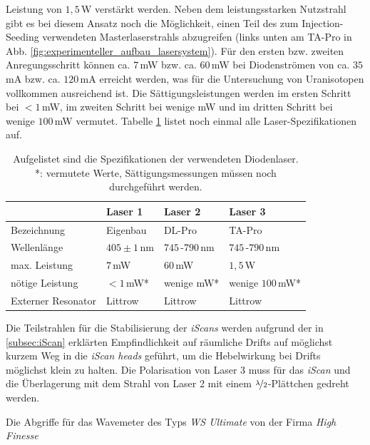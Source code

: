 Leistung von $1,5\,$W verstärkt werden. Neben dem leistungsstarken Nutzstrahl
gibt es bei diesem Ansatz noch die Möglichkeit, einen Teil des zum
Injection-Seeding verwendeten Masterlaserstrahls abzugreifen (links unten am TA-Pro in Abb.
\ref{fig:experimenteller_aufbau_lasersystem}). Für den ersten bzw.
zweiten Anregungsschritt können ca. $7\,$mW bzw. ca. $60\,$mW bei Diodenströmen von ca. $35\,$mA bzw. ca.
$120\,$mA erreicht werden, was für die Untersuchung von Uranisotopen vollkommen
ausreichend ist. Die Sättigungsleistungen werden im ersten Schritt bei $<1\,$mW,
im zweiten Schritt bei wenige mW und im dritten Schritt bei wenige $100\,$mW
vermutet.
Tabelle \ref{tab:laser_spezifikationen} listet noch einmal alle Laser-Spezifikationen auf.
\par
\begin{table}
	\begin{tabular}{p{}|p{}p{}p{}}
		\toprule
		& Laser 1 & Laser 2 & Laser 3\\
		\midrule[1px]
		\hline
		Bezeichnung & Eigenbau & DL-Pro & TA-Pro\\
		Wellenlänge & $405\pm1\,$nm & $745\,$-$790\,$nm & $745\,$-$790\,$nm\\
		max. Leistung & $7\,$mW & $60\,$mW & $1,5\,$W\\
		nötige Leistung & $<1\,$mW* & wenige mW* & wenige $100\,$mW*\\
		Externer Resonator & Littrow & Littrow & Littrow\\
		\bottomrule[1px]
	\end{tabular}
	\caption[Spezifikationen der verwendeten
	Diodenlaser]{Aufgelistet sind die Spezifikationen der verwendeten
	Diodenlaser.\\
	*: vermutete Werte, Sättigungsmessungen müssen noch durchgeführt werden.}
	\label{tab:laser_spezifikationen}
\end{table}
Die Teilstrahlen für die Stabilisierung der \textit{iScans} werden aufgrund der
in \ref{subsec:iScan} erklärten Empfindlichkeit auf räumliche Drifts auf
möglichst kurzem Weg in die \textit{iScan heads} geführt, um die Hebelwirkung
bei Drifts möglichst klein zu halten. Die Polarisation von Laser 3 muss für
das \textit{iScan} und die Überlagerung mit dem Strahl von Laser 2 mit einem
$\nicefrac{\lambda}{2}$-Plättchen gedreht werden.\par
Die Abgriffe für das Wavemeter des Typs \textit{WS Ultimate} von der Firma \textit{High Finesse}
